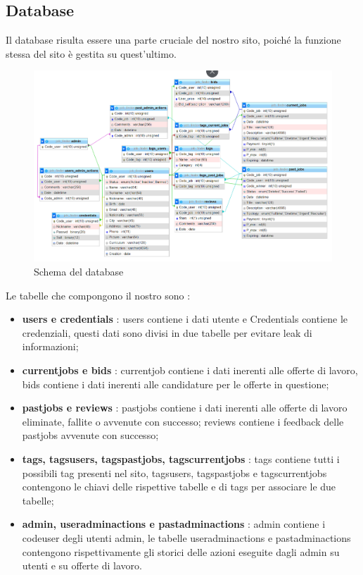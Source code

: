  \subsection{Database}
  Il database risulta essere una parte cruciale del nostro sito, poiché la funzione stessa del sito è gestita su quest'ultimo.
  \begin{figure}[h]
    \includegraphics[scale=0.5]{Images/DB2.png}
    \caption{Schema del database}
    \centering
  \end{figure}
  Le tabelle che compongono il nostro sono :
  \begin{itemize}
    \item \textbf{users e credentials} : users contiene i dati utente e Credentials contiene le credenziali, questi dati sono divisi in due tabelle per evitare leak di informazioni;
    \item \textbf{current\textunderscore jobs e bids} : current\textunderscore job contiene i dati inerenti alle offerte di lavoro, bids contiene i dati inerenti alle candidature per le offerte in questione;
    \item \textbf{past\textunderscore jobs e reviews} : past\textunderscore jobs contiene i dati inerenti alle offerte di lavoro eliminate, fallite o avvenute con successo; reviews contiene i feedback delle past\textunderscore jobs avvenute con successo;
    \item \textbf{tags, tags\textunderscore users, tags\textunderscore past\textunderscore jobs, tags\textunderscore current\textunderscore jobs} : tags contiene tutti i possibili tag presenti nel sito, tags\textunderscore users, tags\textunderscore past\textunderscore jobs e tags\textunderscore current\textunderscore jobs contengono le chiavi delle rispettive tabelle e di tags per associare le due tabelle;
    \item \textbf{admin, user\textunderscore admin\textunderscore actions e past\textunderscore admin\textunderscore actions} : admin contiene i code\textunderscore user degli utenti admin, le tabelle user\textunderscore admin\textunderscore actions e past\textunderscore admin\textunderscore actions contengono rispettivamente gli storici delle azioni eseguite dagli admin su utenti e su offerte di lavoro. 
  
  \end{itemize}

